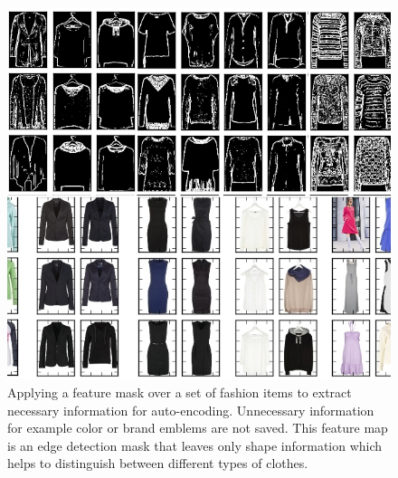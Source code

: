 \begin{figure}[t!]
\centering
\includegraphics[width=.48\linewidth]{figs/convolution.png}
\caption{Applying a feature mask over a set of fashion items to extract necessary information for auto-encoding. Unnecessary information for example color or brand emblems are not saved. This feature map is an edge detection mask that leaves only shape information which helps to distinguish between different types of clothes.} 
\label{fig:convolution}
\end{figure}


